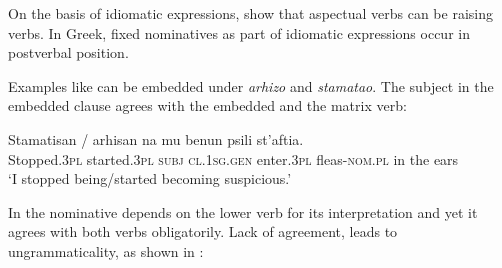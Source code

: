 \documentclass[output=paper]{langscibook}
\begin{document}
\ea%
    \label{alexiadouex:key:12}
    \z 
\ex%
    \label{alexiadouex:key:13}
    \z 
\z 

On the basis of idiomatic expressions, \citet{alexiadouanagnostopoulou1999} show that aspectual verbs can be raising verbs. 
In Greek, fixed nominatives as part of idiomatic expressions occur in postverbal position. 
        
\ea%
    \label{alexiadouex:key:14}
    \z 
\z

Examples like  can be embedded under \textit{arhizo} and \textit{stamatao}. 
The subject in the embedded clause agrees with the embedded and the matrix verb:

\ea%
    \label{alexiadouex:key:15}
    \gll Stamatisan / arhisan    na   mu     benun psili    st'aftia.\\
    Stopped.\textsc{3pl} {} started.\textsc{3pl}  \textsc{subj}  \textsc{cl}{}.\textsc{1sg.gen} enter.\textsc{3pl} fleas-\textsc{nom.pl} {in the ears}\\
    \glt  ‘I stopped being/started becoming suspicious.’
\z

In  the nominative depends on the lower verb for its interpretation and yet it agrees with both verbs obligatorily. 
Lack of agreement, leads to ungrammaticality, as shown in : 
\end{document}
